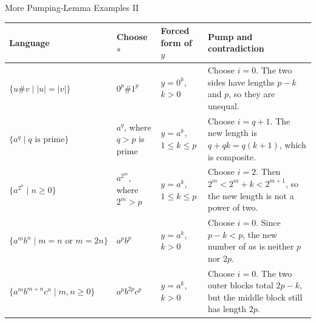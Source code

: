 \documentclass[10pt,aspectratio=169]{beamer}
\begin{document}
\begin{frame}{More Pumping-Lemma Examples II}

\scriptsize
\renewcommand{\arraystretch}{1.35}
\setlength{\tabcolsep}{3pt}

\begin{center}
\begin{tabular}{p{3.0cm}p{2.5cm}p{2.2cm}p{5.3cm}}
\toprule
\textbf{Language} &
\textbf{Choose $s$} &
\textbf{Forced form of $y$} &
\textbf{Pump and contradiction} \\
\midrule

$\{u\#v\mid |u|=|v|\}$ &
$0^p\#1^p$ &
$y=0^k$, $k>0$ &
Choose $i=0$. The two sides have lengths $p-k$ and $p$, so they are unequal. \\

\addlinespace

$\{a^q\mid q\text{ is prime}\}$ &
$a^q$, where $q>p$ is prime &
$y=a^k$, $1\leq k\leq p$ &
Choose $i=q+1$. The new length is
$q+qk=q(k+1)$, which is composite. \\

\addlinespace

$\{a^{2^n}\mid n\geq 0\}$ &
$a^{2^m}$, where $2^m>p$ &
$y=a^k$, $1\leq k\leq p$ &
Choose $i=2$. Then
$2^m<2^m+k<2^{m+1}$, so the new length is not a power of two. \\

\addlinespace

$\{a^mb^n\mid m=n\text{ or \ \ \ \ \ }m=2n\}$ &
$a^pb^p$ &
$y=a^k$, $k>0$ &
Choose $i=0$. Since $p-k<p$, the new number of $a$s is neither $p$ nor $2p$. \\

\addlinespace

$\{a^mb^{m+n}c^n\mid m,n\geq 0\}$ &
$a^pb^{2p}c^p$ &
$y=a^k$, $k>0$ &
Choose $i=0$. The two outer blocks total $2p-k$, but the middle block still has length $2p$. \\

\bottomrule
\end{tabular}
\end{center}

\end{frame}
\end{document}
